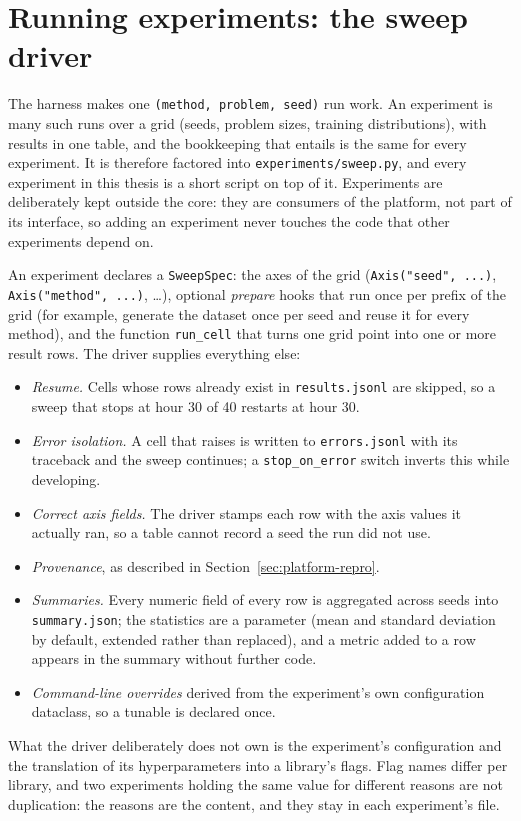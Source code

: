 \section{Running experiments: the sweep driver}
\label{sec:platform-sweep}

The harness makes one \texttt{(method, problem, seed)} run work. An experiment
is many such runs over a grid (seeds, problem sizes, training distributions),
with results in one table, and the bookkeeping that entails is the same for
every experiment. It is therefore factored into
\texttt{experiments/sweep.py}, and every experiment in this thesis is a short
script on top of it. Experiments are deliberately kept outside the core: they
are consumers of the platform, not part of its interface, so adding an
experiment never touches the code that other experiments depend on.

An experiment declares a \texttt{SweepSpec}: the axes of the grid
(\texttt{Axis("seed", ...)}, \texttt{Axis("method", ...)}, \ldots), optional
\emph{prepare} hooks that run once per prefix of the grid (for example,
generate the dataset once per seed and reuse it for every method), and the
function \texttt{run\_cell} that turns one grid point into one or more result
rows. The driver supplies everything else:
\begin{itemize}
  \item \emph{Resume.} Cells whose rows already exist in \texttt{results.jsonl}
    are skipped, so a sweep that stops at hour 30 of 40 restarts at hour 30.
  \item \emph{Error isolation.} A cell that raises is written to
    \texttt{errors.jsonl} with its traceback and the sweep continues; a
    \texttt{stop\_on\_error} switch inverts this while developing.
  \item \emph{Correct axis fields.} The driver stamps each row with the axis
    values it actually ran, so a table cannot record a seed the run did not
    use.
  \item \emph{Provenance}, as described in Section~\ref{sec:platform-repro}.
  \item \emph{Summaries.} Every numeric field of every row is aggregated
    across seeds into \texttt{summary.json}; the statistics are a parameter
    (mean and standard deviation by default, extended rather than replaced),
    and a metric added to a row appears in the summary without further code.
  \item \emph{Command-line overrides} derived from the experiment's own
    configuration dataclass, so a tunable is declared once.
\end{itemize}
What the driver deliberately does not own is the experiment's configuration
and the translation of its hyperparameters into a library's flags. Flag names
differ per library, and two experiments holding the same value for different
reasons are not duplication: the reasons are the content, and they stay in
each experiment's file.

